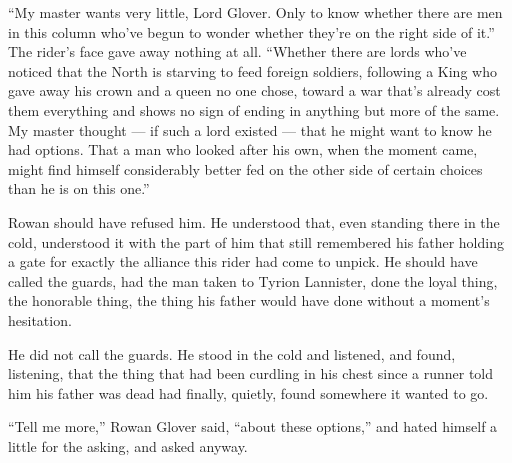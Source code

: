 “My master wants very little, Lord Glover. Only to know whether there are men in this column who’ve begun to wonder whether they’re on the right side of it.” The rider’s face gave away nothing at all. “Whether there are lords who’ve noticed that the North is starving to feed foreign soldiers, following a King who gave away his crown and a queen no one chose, toward a war that’s already cost them everything and shows no sign of ending in anything but more of the same. My master thought — if such a lord existed — that he might want to know he had options. That a man who looked after his own, when the moment came, might find himself considerably better fed on the other side of certain choices than he is on this one.”

Rowan should have refused him. He understood that, even standing there in the cold, understood it with the part of him that still remembered his father holding a gate for exactly the alliance this rider had come to unpick. He should have called the guards, had the man taken to Tyrion Lannister, done the loyal thing, the honorable thing, the thing his father would have done without a moment’s hesitation.

He did not call the guards. He stood in the cold and listened, and found, listening, that the thing that had been curdling in his chest since a runner told him his father was dead had finally, quietly, found somewhere it wanted to go.

“Tell me more,” Rowan Glover said, “about these options,” and hated himself a little for the asking, and asked anyway.